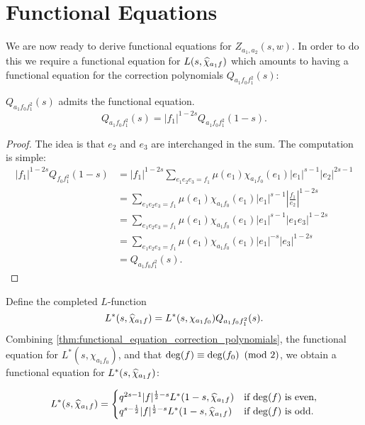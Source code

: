\documentclass[12pt,reqno,oneside]{amsart}
\begin{document}
\section{Functional Equations}
    We are now ready to derive functional equations for $Z_{a_{1},a_{2}}(s,w)$. In order to do this we require a functional equation for $L(s,\widehat{\chi}_{a_{1}f})$ which amounts to having a functional equation for the correction polynomials $Q_{a_{1}f_{0}f_{1}^{2}}(s)$:

    \begin{theorem}\label{thm:functional_equation_correction_polynomials}
        $Q_{a_{1}f_{0}f_{1}^{2}}(s)$ admits the functional equation.
        \[
            Q_{a_{1}f_{0}f_{1}^{2}}(s) = |f_{1}|^{1-2s}Q_{a_{1}f_{0}f_{1}^{2}}(1-s).
        \]
    \end{theorem}
    \begin{proof}
        The idea is that $e_{2}$ and $e_{3}$ are interchanged in the sum. The computation is simple:
        \begin{align*}
            |f_{1}|^{1-2s}Q_{f_{0}f_{1}^{2}}(1-s) &= |f_{1}|^{1-2s}\sum_{e_{1}e_{2}e_{3} = f_{1}}\mu(e_{1})\chi_{a_{1}f_{0}}(e_{1})|e_{1}|^{s-1}|e_{2}|^{2s-1} \\
            &= \sum_{e_{1}e_{2}e_{3} = f_{1}}\mu(e_{1})\chi_{a_{1}f_{0}}(e_{1})|e_{1}|^{s-1}\left|\frac{f_{1}}{e_{2}}\right|^{1-2s} \\
            &= \sum_{e_{1}e_{2}e_{3} = f_{1}}\mu(e_{1})\chi_{a_{1}f_{0}}(e_{1})|e_{1}|^{s-1}|e_{1}e_{3}|^{1-2s} \\
            &= \sum_{e_{1}e_{2}e_{3} = f_{1}}\mu(e_{1})\chi_{a_{1}f_{0}}(e_{1})|e_{1}|^{-s}|e_{3}|^{1-2s} \\
            &= Q_{a_{1}f_{0}f_{1}^{2}}(s).
        \end{align*}
    \end{proof}

    Define the completed $L$-function
    \[
        L^{\ast}(s,\widehat{\chi}_{a_{1}f}) = L^{\ast}(s,\chi_{a_{1}f_{0}})Q_{a_{1}f_{0}f_{1}^{2}}(s).
    \]
    Combining \cref{thm:functional_equation_correction_polynomials}, the functional equation for $L^{\ast}(s,\chi_{a_{1}f_{0}})$, and that $\deg(f) \equiv \deg(f_{0}) \ \left(\text{mod }2\right)$, we obtain a functional equation for $L^{\ast}(s,\widehat{\chi}_{a_{1}f})$:

    \[
        L^{\ast}(s,\widehat{\chi}_{a_{1}f}) = \begin{cases} q^{2s-1}|f|^{\frac{1}{2}-s}L^{\ast}(1-s,\widehat{\chi}_{a_{1}f}) & \text{if $\deg(f)$ is even}, \\ q^{s-\frac{1}{2}}|f|^{\frac{1}{2}-s}L^{\ast}(1-s,\widehat{\chi}_{a_{1}f}) & \text{if $\deg(f)$ is odd}. \end{cases}
    \]
\end{document}
